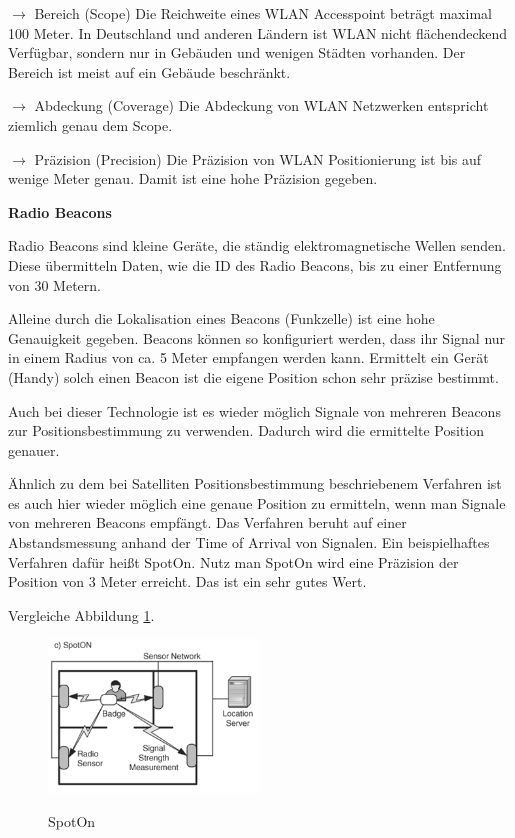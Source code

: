 \cite[S. 209-211]{Schiller2004}

$\longrightarrow$ Bereich (Scope) Die Reichweite eines WLAN Accesspoint beträgt maximal 100 Meter. In Deutschland und anderen Ländern ist WLAN nicht flächendeckend Verfügbar, sondern nur in Gebäuden und wenigen Städten vorhanden. Der Bereich ist meist auf ein Gebäude beschränkt.

$\longrightarrow$ Abdeckung (Coverage) Die Abdeckung von WLAN Netzwerken entspricht ziemlich genau dem Scope. 

$\longrightarrow$ Präzision (Precision) Die Präzision von WLAN Positionierung ist bis auf wenige Meter genau. Damit ist eine hohe Präzision gegeben.

\textbf{Radio Beacons} \label{radiobutton}

Radio Beacons sind kleine Geräte, die ständig elektromagnetische Wellen senden. Diese übermitteln Daten, wie die ID des Radio Beacons, bis zu einer Entfernung von 30 Metern.

Alleine durch die Lokalisation eines Beacons (Funkzelle) ist eine hohe Genauigkeit gegeben. Beacons können so konfiguriert werden, dass ihr Signal nur in einem Radius von ca. 5 Meter empfangen werden kann. Ermittelt ein Gerät (Handy) solch einen Beacon ist die eigene Position schon sehr präzise bestimmt.

Auch bei dieser Technologie ist es wieder möglich Signale von mehreren Beacons zur Positionsbestimmung zu verwenden. Dadurch wird die ermittelte Position genauer. %

Ähnlich zu dem bei Satelliten Positionsbestimmung beschriebenem Verfahren ist es auch hier wieder möglich eine genaue Position zu ermitteln, wenn man Signale von mehreren Beacons empfängt. Das Verfahren beruht auf einer Abstandsmessung anhand der Time of Arrival von Signalen. Ein beispielhaftes Verfahren dafür heißt SpotOn.
Nutz man SpotOn wird eine Präzision der Position von 3 Meter erreicht. Das ist ein sehr gutes Wert.

\cite[S. 201 - 204]{Schiller2004}

Vergleiche Abbildung \ref{fig:SpotOn}.

\begin{figure}[h]
\centering
\includegraphics[width=0.5\textwidth]{ref/images/SpotOn.PNG}
\caption[SpotOn]{SpotOn}
\label{fig:SpotOn}
\cite[S. 201]{Schiller2004}
\end{figure}


